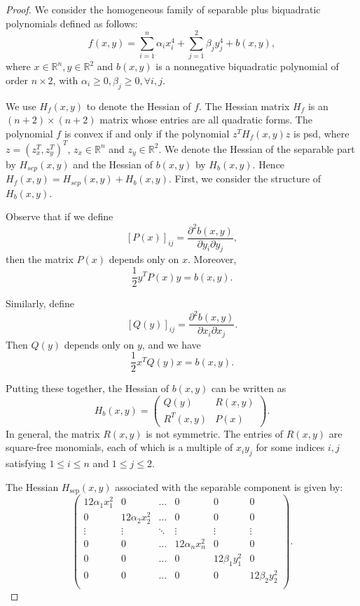 \documentclass[12pt]{elsarticle}
\theoremstyle{definition}
\begin{document}
\begin{proof}
We consider the homogeneous family of separable plus biquadratic polynomials defined as follows:
\begin{equation}\label{spbq}
f(x,y) = \sum_{i=1}^n \alpha_i x_i^4 + \sum_{j=1}^2 \beta_j y_j^4 + b(x,y),
\end{equation}
where $x\in \mathbb{R}^n, y\in\mathbb{R}^{2}$ and $b(x,y)$ is a nonnegative biquadratic polynomial of order $n\times 2$, with $\alpha_i\geq 0, \beta_j\geq 0, \forall i,j$.

We use $H_f (x,y)$ to denote the Hessian of $f$. The Hessian matrix $H_f$ is an $(n+2)\times(n+2)$ matrix whose entries are all quadratic forms. The polynomial $f$ is convex if and only if the polynomial $z^T H_f(x,y)z$ is psd, where $z=(z_x^T,z_y^T)^T$, $z_x\in\mathbb{R}^n$ and $z_y\in\mathbb{R}^2$. We denote the Hessian of the separable part by $H_{sep}(x,y)$ and the Hessian of $b(x,y)$ by $H_b(x,y)$. Hence $H_f(x,y) = H_{sep}(x,y) + H_b(x,y)$. First, we consider the structure of $H_b(x,y)$.

Observe that if we define
\[
[P(x)]_{ij}=\frac{\partial^2 b(x,y)}{\partial y_i \partial y_j},
\]
then the matrix $P(x)$ depends only on $x$. Moreover,
\begin{equation}\label{P(x)}
\frac{1}{2}y^T P(x) y = b(x,y). 
\end{equation}

Similarly, define
\[
[Q(y)]_{ij}=\frac{\partial^2 b(x,y)}{\partial x_i \partial x_j}.
\]
Then $Q(y)$ depends only on $y$, and we have
\begin{equation}\label{Q(y)}
\frac{1}{2}x^T Q(y) x = b(x,y). 
\end{equation}

Putting these together, the Hessian of $b(x,y)$ can be written as
\begin{equation}\label{H_b}
H_b(x,y)=
\begin{pmatrix}
Q(y) & R(x,y) \\
R^T(x,y) & P(x)
\end{pmatrix}.
\end{equation}
In general, the matrix \(R(x,y)\) is not symmetric. The entries of \(R(x,y)\) are square-free monomials, each of which is a multiple of \(x_i y_j\) for some indices \(i,j\) satisfying \(1 \le i \le n\) and \(1 \le j \le 2\).

The Hessian \(H_{\mathrm{sep}}(x,y)\) associated with the separable component is given by:
\begin{equation}\label{H_sep}
    \begin{pmatrix}
        12\alpha_1x_1^2 & 0 & \dots & 0 & 0 & 0\\
        0 & 12\alpha_2x_2^2 & \dots & 0 & 0 & 0\\
        \vdots & \vdots & \ddots & \vdots & \vdots & \vdots\\
        0 & 0 & \dots & 12\alpha_n x_n^2 & 0 & 0\\
        0 & 0 & \dots & 0 & 12\beta_1y_1^2 & 0\\
        0 & 0 & \dots & 0 & 0 & 12\beta_2y_2^2\\
    \end{pmatrix}.
\end{equation}


\end{proof}
\end{document}
